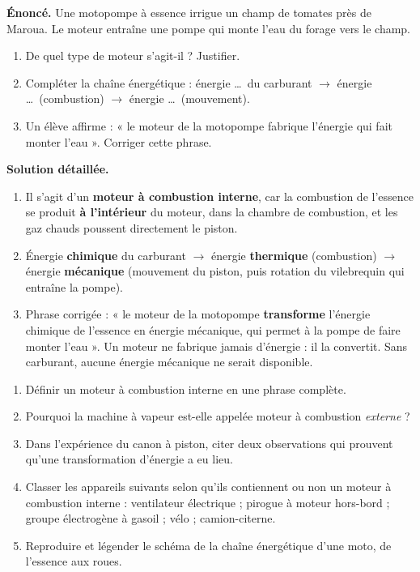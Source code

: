 \documentclass[11pt]{article}
\begin{document}
\begin{exoresolu}
\textbf{Énoncé.} Une motopompe à essence irrigue un champ de tomates près de Maroua. Le moteur entraîne une pompe qui monte l'eau du forage vers le champ.
\begin{enumerate}
\item De quel type de moteur s'agit-il ? Justifier.
\item Compléter la chaîne énergétique : énergie \ldots\ du carburant $\rightarrow$ énergie \ldots\ (combustion) $\rightarrow$ énergie \ldots\ (mouvement).
\item Un élève affirme : « le moteur de la motopompe fabrique l'énergie qui fait monter l'eau ». Corriger cette phrase.
\end{enumerate}
\tcblower
\textbf{Solution détaillée.}
\begin{enumerate}
\item Il s'agit d'un \textbf{moteur à combustion interne}, car la combustion de l'essence se produit \textbf{à l'intérieur} du moteur, dans la chambre de combustion, et les gaz chauds poussent directement le piston.
\item Énergie \textbf{chimique} du carburant $\rightarrow$ énergie \textbf{thermique} (combustion) $\rightarrow$ énergie \textbf{mécanique} (mouvement du piston, puis rotation du vilebrequin qui entraîne la pompe).
\item Phrase corrigée : « le moteur de la motopompe \textbf{transforme} l'énergie chimique de l'essence en énergie mécanique, qui permet à la pompe de faire monter l'eau ». Un moteur ne fabrique jamais d'énergie : il la convertit. Sans carburant, aucune énergie mécanique ne serait disponible.
\end{enumerate}
\end{exoresolu}

\begin{exercice}
\begin{enumerate}
\item Définir un moteur à combustion interne en une phrase complète.
\item Pourquoi la machine à vapeur est-elle appelée moteur à combustion \emph{externe} ?
\item Dans l'expérience du canon à piston, citer deux observations qui prouvent qu'une transformation d'énergie a eu lieu.
\item Classer les appareils suivants selon qu'ils contiennent ou non un moteur à combustion interne : ventilateur électrique ; pirogue à moteur hors-bord ; groupe électrogène à gasoil ; vélo ; camion-citerne.
\item Reproduire et légender le schéma de la chaîne énergétique d'une moto, de l'essence aux roues.
\end{enumerate}
\end{exercice}
\end{document}
